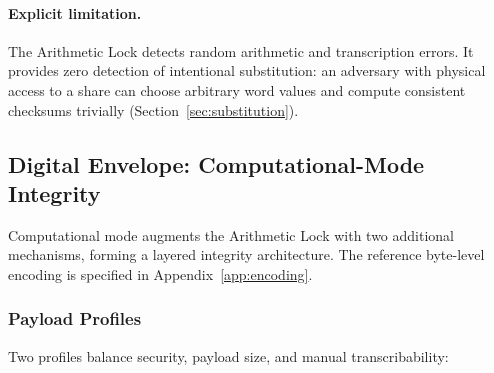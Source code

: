 \documentclass[11pt]{article}
\begin{document}
\paragraph{Explicit limitation.} The Arithmetic Lock detects random arithmetic and transcription errors. It provides zero detection of intentional substitution: an adversary with physical access to a share can choose arbitrary word values and compute consistent checksums trivially (Section~\ref{sec:substitution}).

\subsection{Digital Envelope: Computational-Mode Integrity}
\label{sec:digital-envelope}

Computational mode augments the Arithmetic Lock with two additional mechanisms, forming a layered integrity architecture. The reference byte-level encoding is specified in Appendix~\ref{app:encoding}.

\subsubsection{Payload Profiles}
\label{sec:modes}

Two profiles balance security, payload size, and manual transcribability:
\end{document}
